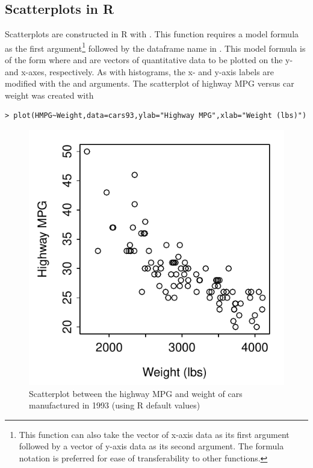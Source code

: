 \documentclass[10pt,openany]{book}\usepackage[]{graphicx}\usepackage[]{color}
\makeatletter
\newenvironment{kframe}{%
 \def\at@end@of@kframe{}%
 \ifinner\ifhmode%
  \def\at@end@of@kframe{\end{minipage}}%
  \begin{minipage}{\columnwidth}%
 \fi\fi%
 \def\FrameCommand##1{\hskip\@totalleftmargin \hskip-\fboxsep
 \colorbox{shadecolor}{##1}\hskip-\fboxsep
     \hskip-\linewidth \hskip-\@totalleftmargin \hskip\columnwidth}%
 \MakeFramed {\advance\hsize-\width
   \@totalleftmargin\z@ \linewidth\hsize
   \@setminipage}}%
 {\par\unskip\endMakeFramed%
 \at@end@of@kframe}
\newenvironment{knitrout}{}{} %
\makeatother
\begin{document}

\subsection{Scatterplots in R}
Scatterplots are constructed in R with .  This function requires a model formula as the first argument\footnote{This function can also take the vector of x-axis data as its first argument followed by a vector of y-axis data as its second argument.  The formula notation is preferred for ease of transferability to other functions.} followed by the dataframe name in .  This model formula is of the form  where  and  are vectors of quantitative data to be plotted on the y- and x-axes, respectively.  As with histograms, the x- and y-axis labels are modified with the  and  arguments.  The scatterplot of highway MPG versus car weight  was created with

\begin{knitrout}
\color{fgcolor}\begin{kframe}
\begin{verbatim}
> plot(HMPG~Weight,data=cars93,ylab="Highway MPG",xlab="Weight (lbs)")
\end{verbatim}
\end{kframe}\begin{figure}[hbtp]

{\centering \includegraphics[width=.4\linewidth]{Figs/Scatplot1-1} 

}

\caption[Scatterplot between the highway MPG and weight of cars manufactured in 1993 (using R default values)]{Scatterplot between the highway MPG and weight of cars manufactured in 1993 (using R default values)}\label{fig:Scatplot1}
\end{figure}


\end{knitrout}
\end{document}
